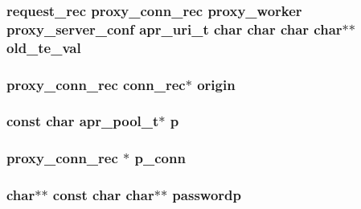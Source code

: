 \subsubsection[{\texorpdfstring{old\+\_\+te\+\_\+val}{old_te_val}}]{ {\bf request\+\_\+rec} {\bf proxy\+\_\+conn\+\_\+rec} {\bf proxy\+\_\+worker} {\bf proxy\+\_\+server\+\_\+conf} {\bf apr\+\_\+uri\+\_\+t} char char char char$\ast$$\ast$ old\+\_\+te\+\_\+val}\hypertarget{group__MOD__PROXY_ga0e5dc25dbb841b78fb7bc12b53b8f26c}{}\label{group__MOD__PROXY_ga0e5dc25dbb841b78fb7bc12b53b8f26c}
\subsubsection[{\texorpdfstring{origin}{origin}}]{ {\bf proxy\+\_\+conn\+\_\+rec} {\bf conn\+\_\+rec}$\ast$ origin}\hypertarget{group__MOD__PROXY_gac3d9b5c9be0a48d3b3b1203050929127}{}\label{group__MOD__PROXY_gac3d9b5c9be0a48d3b3b1203050929127}
\subsubsection[{\texorpdfstring{p}{p}}]{\setlength{\rightskip}{0pt plus 5cm}const char {\bf apr\+\_\+pool\+\_\+t}$\ast$ p}\hypertarget{group__MOD__PROXY_ga2b87ce5c0cd5c5aa97fd3ba98460ab16}{}\label{group__MOD__PROXY_ga2b87ce5c0cd5c5aa97fd3ba98460ab16}
\subsubsection[{\texorpdfstring{p\+\_\+conn}{p_conn}}]{ {\bf proxy\+\_\+conn\+\_\+rec} $\ast$ p\+\_\+conn}\hypertarget{group__MOD__PROXY_ga9751c38cba4756a499d065b1f8a0c0b0}{}\label{group__MOD__PROXY_ga9751c38cba4756a499d065b1f8a0c0b0}
\subsubsection[{\texorpdfstring{passwordp}{passwordp}}]{\setlength{\rightskip}{0pt plus 5cm}char$\ast$$\ast$ const char char$\ast$$\ast$ passwordp}\hypertarget{group__MOD__PROXY_ga93be1099b442eb117913f581e856e788}{}\label{group__MOD__PROXY_ga93be1099b442eb117913f581e856e788}
